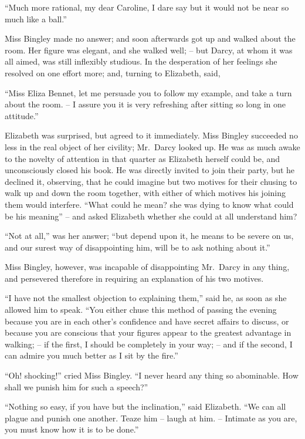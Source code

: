 “Much more rational, my dear Caroline, I dare say
but it would not be near so much like a ball.”

Miss Bingley made no answer; and soon afterwards
got up and walked about the room. Her figure was
elegant, and she walked well; -- but Darcy, at whom it
was all aimed, was still inflexibly studious. In the desperation
of her feelings she resolved on one effort more; and,
turning to Elizabeth, said,

“Miss Eliza Bennet, let me persuade you to follow my
example, and take a turn about the room. -- I assure you
it is very refreshing after sitting so long in one attitude.”

Elizabeth was surprised, but agreed to it immediately.
Miss Bingley succeeded no less in the real object of her
civility; Mr.\ Darcy looked up. He was as much awake
to the novelty of attention in that quarter as Elizabeth
herself could be, and unconsciously closed his book. He
was directly invited to join their party, but he declined
it, observing, that he could imagine but two motives for
their chusing to walk up and down the room together,
with either of which motives his joining them would
interfere. “What could he mean? she was dying to
know what could be his meaning” -- and asked Elizabeth
whether she could at all understand him?

“Not at all,” was her answer; “but depend upon it,
he means to be severe on us, and our surest way of disappointing
him, will be to ask nothing about it.”

Miss Bingley, however, was incapable of disappointing
Mr.\ Darcy in any thing, and persevered therefore in
requiring an explanation of his two motives.

“I have not the smallest objection to explaining them,”
said he, as soon as she allowed him to speak. “You
either chuse this method of passing the evening because
you are in each other’s confidence and have secret affairs
to discuss, or because you are conscious that your figures
appear to the greatest advantage in walking; -- if the first,
I should be completely in your way; -- and if the second,
I can admire you much better as I sit by the fire.”

“Oh! shocking!” cried Miss Bingley. “I never heard
any thing so abominable. How shall we punish him for
such a speech?”

“Nothing so easy, if you have but the inclination,”
said Elizabeth. “We can all plague and punish one
another. Teaze him -- laugh at him. -- Intimate as you
are, you must know how it is to be done.”

